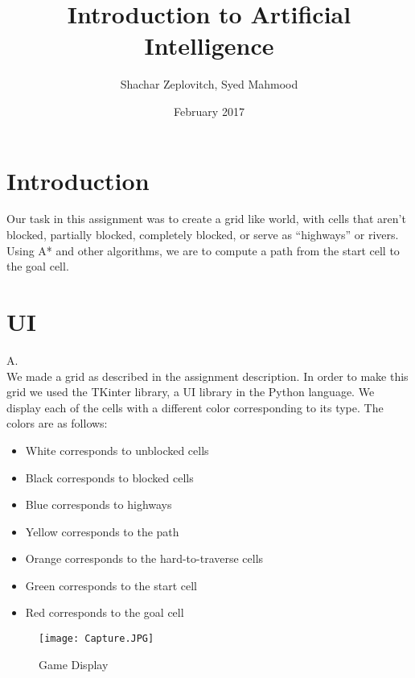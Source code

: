 \documentclass{report}
\title{Introduction to Artificial Intelligence}
\author{Shachar Zeplovitch, Syed Mahmood}
\date{February 2017}
\begin{document}
    \maketitle

    \section{Introduction}

    Our task in this assignment was to create a grid like world, with cells that aren't blocked, partially blocked, completely blocked, or serve as “highways” or rivers.
    Using A* and other algorithms, we are to compute a path from the start cell to the goal cell.


    \maketitle

    \section{UI}

    {\huge A.} \\
    We made a grid as described in the assignment description. In order to make this grid we used the TKinter library, a UI library in the Python language.
    We display each of the cells with a different color corresponding to its type.
    The colors are as follows:

    \begin{itemize}
        \item White corresponds to unblocked cells
        \item Black corresponds to blocked cells
        \item Blue corresponds to highways
        \item Yellow corresponds to the path
        \item Orange corresponds to the hard-to-traverse cells
        \item Green corresponds to the start cell
        \item Red corresponds to the goal cell
    \end{itemize}



    \begin{figure}
        \centering
        \texttt{[image: Capture.JPG]}
        \caption{Game Display}
        \label{fig:my_label}
    \end{figure}
\end{document}
